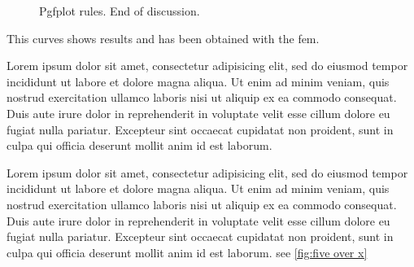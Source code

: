             \begin{figure}[ht!]
                \centering
                \caption{Pgfplot rules. End of discussion.}
                \label{fig:pgfplotExample}
            \end{figure}
        \fi 
        
        This curves shows results and has been obtained with the \gls{fem}. 

        
        Lorem ipsum dolor sit amet, consectetur adipisicing elit, sed do eiusmod tempor incididunt ut labore et dolore magna aliqua. Ut enim ad minim veniam, quis nostrud exercitation ullamco laboris nisi ut aliquip ex ea commodo consequat. Duis aute irure dolor in reprehenderit in voluptate velit esse cillum dolore eu fugiat nulla pariatur. Excepteur sint occaecat cupidatat non proident, sunt in culpa qui officia deserunt mollit anim id est laborum.

        Lorem ipsum dolor sit amet, consectetur adipisicing elit, sed do eiusmod tempor incididunt ut labore et dolore magna aliqua. Ut enim ad minim veniam, quis nostrud exercitation ullamco laboris nisi ut aliquip ex ea commodo consequat. Duis aute irure dolor in reprehenderit in voluptate velit esse cillum dolore eu fugiat nulla pariatur. Excepteur sint occaecat cupidatat non proident, sunt in culpa qui officia deserunt mollit anim id est laborum.
        see \ref{fig:five over x}

